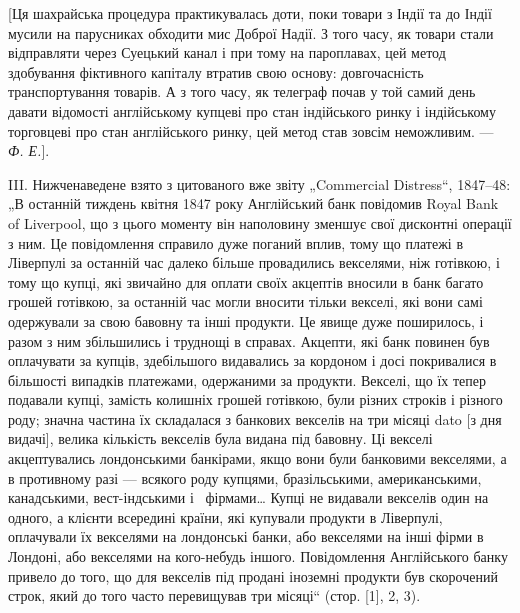 
[Ця шахрайська процедура практикувалась доти, поки товари з Індії та до
Індії мусили на парусниках обходити мис Доброї Надії. З того часу, як товари
стали відправляти через Суецький канал і при тому на пароплавах, цей метод
здобування фіктивного капіталу втратив свою основу: довгочасність транспортування товарів. А з того
часу, як телеграф почав у той самий день давати відомості англійському купцеві про стан індійського
ринку і індійському торговцеві про стан англійського ринку, цей метод став зовсім неможливим. — \emph{Ф.
Е.}].

III. Нижченаведене взято з цитованого вже звіту „Commercial Distress“,
1847--48: „В останній тиждень квітня 1847 року Англійський банк повідомив
Royal Bank of Liverpool, що з цього моменту він наполовину зменшує свої дисконтні операції з ним. Це
повідомлення справило дуже поганий вплив, тому
що платежі в Ліверпулі за останній час далеко більше провадились векселями,
ніж готівкою, і тому що купці, які звичайно для оплати своїх акцептів вносили
в банк багато грошей готівкою, за останній час могли вносити тільки векселі,
які вони самі одержували за свою бавовну та інші продукти. Це явище дуже
поширилось, і разом з ним збільшились і труднощі в справах. Акцепти, які
банк повинен був оплачувати за купців, здебільшого видавались за кордоном
і досі покривалися в більшості випадків платежами, одержаними за продукти. Векселі, що їх тепер
подавали купці, замість колишніх грошей готівкою, були
різних строків і різного роду; значна частина їх складалася з банкових векселів на три місяці dato
[з дня видачі], велика кількість векселів була видана
під бавовну. Ці векселі акцептувались лондонськими банкірами, якщо вони були
банковими векселями, а в противному разі — всякого роду купцями, бразільськими,
американськими, канадськими, вест-індськими і~ фірмами\dots{} Купці не видавали векселів один на
одного, а клієнти всередині країни, які купували продукти в Ліверпулі, оплачували їх векселями на
лондонські банки, або векселями на інші фірми в Лондоні, або векселями на кого-небудь іншого.
Повідомлення Англійського банку привело до того, що для векселів під продані іноземні продукти був
скорочений строк, який до того часто перевищував три місяці“ (стор. [1], 2, 3).

